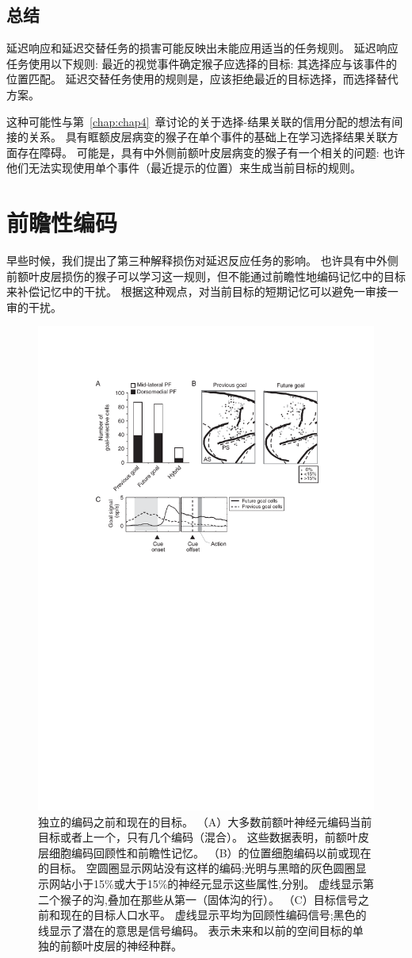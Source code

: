 \subsection{总结}

延迟响应和延迟交替任务的损害可能反映出未能应用适当的任务规则。
延迟响应任务使用以下规则: 最近的视觉事件确定猴子应选择的目标: 
其选择应与该事件的位置匹配。
延迟交替任务使用的规则是，应该拒绝最近的目标选择，而选择替代方案。


这种可能性与第~\ref{chap:chap4}~章讨论的关于选择-结果关联的信用分配的想法有间接的关系。
具有眶额皮层病变的猴子在单个事件的基础上在学习选择结果关联方面存在障碍。
可能是，具有中外侧前额叶皮层病变的猴子有一个相关的问题: 
也许他们无法实现使用单个事件（最近提示的位置）来生成当前目标的规则。



\section{前瞻性编码}

早些时候，我们提出了第三种解释损伤对延迟反应任务的影响。
也许具有中外侧前额叶皮层损伤的猴子可以学习这一规则，但不能通过前瞻性地编码记忆中的目标来补偿记忆中的干扰。
根据这种观点，对当前目标的短期记忆可以避免一审接一审的干扰。


\begin{figure}
	\centering
	\includegraphics[width=0.5\linewidth]{chap6/6_7}
	\caption{独立的编码之前和现在的目标。
		（A）大多数前额叶神经元编码当前目标或者上一个，只有几个编码（混合）。
		这些数据表明，前额叶皮层细胞编码回顾性和前瞻性记忆。
		（B）的位置细胞编码以前或现在的目标。
		空圆圈显示网站没有这样的编码;光明与黑暗的灰色圆圈显示网站小于15\%或大于15\%的神经元显示这些属性,分别。
		虚线显示第二个猴子的沟,叠加在那些从第一（固体沟的行）。
		（C）目标信号之前和现在的目标人口水平。
		虚线显示平均为回顾性编码信号;黑色的线显示了潜在的意思是信号编码\cite{genovesio2006representation}。
		表示未来和以前的空间目标的单独的前额叶皮层的神经种群。}
	\label{fig:6_7}
\end{figure}


